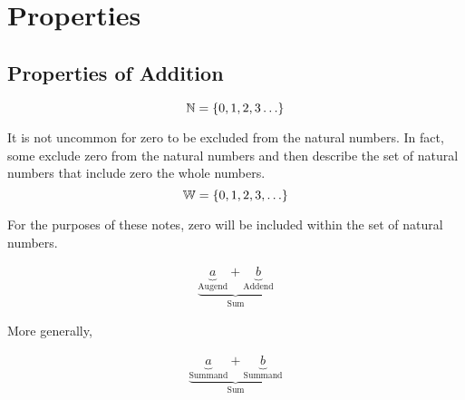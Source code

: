 \documentclass[20150903-160354-rs2.2-MarksMathNotebook.tex]{subfiles}
\begin{document}
%
%

\chapter{Properties}



\section{Properties of Addition}


\begin{definition}

\[
\mathbb{N}=\left\{0, 1, 2, 3 \ldots\right\}
\]

\end{definition}

\begin{remark}
It is not uncommon for zero to be excluded from the natural numbers.  In fact, some exclude zero from the natural numbers and then describe the set of natural numbers that include zero the whole numbers. \\

\[
\mathbb{W}=\left\{0, 1, 2, 3, \ldots\right\}
\]

For the purposes of these notes, zero will be included within the set of natural numbers.
\end{remark}

\begin{definition}
\begin{align}
\underbrace{\underbrace{a}_{\text{Augend}}+\underbrace{b}_{\text{Addend}}}_{\text{Sum}} \label{eq:ooa}
\end{align}

More generally,


\begin{align}
\underbrace{\underbrace{a}_{\text{Summand}}+\underbrace{b}_{\text{Summand}}}_{\text{Sum}} \label{eq:ooag}
\end{align}
\end{definition}
\end{document}
